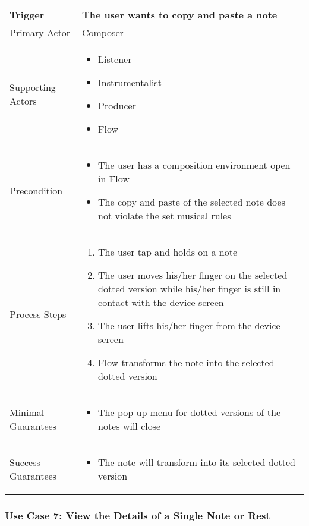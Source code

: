 \begin{tabularx}{\textwidth}{|X|X|}
\hline
Trigger & 
The user wants to copy and paste a note \\
\hline
Primary Actor & 
Composer \\
\hline
Supporting Actors & 
\begin{itemize}
\item Listener
\item Instrumentalist
\item Producer
\item Flow
\end{itemize} \\
\hline
Precondition & 
\begin{itemize}
\item The user has a composition environment open in Flow
\item The copy and paste of the selected note does not violate the set musical rules
\end{itemize} \\
\hline
Process Steps & 
\begin{enumerate}
\item The user tap and holds on a note
\item The user moves his/her finger on the selected dotted version while his/her finger is still in contact with the device screen
\item The user lifts his/her finger from the device screen
\item Flow transforms the note into the selected dotted version
\end{enumerate} \\
\hline
Minimal Guarantees & 
\begin{itemize}
  \item The pop-up menu for dotted versions of the notes will close
\end{itemize} \\
\hline
Success Guarantees & 
\begin{itemize}
  \item The note will transform into its selected dotted version 
\end{itemize} \\
\hline
\end{tabularx}

\subsubsection{Use Case 7: View the Details of a Single Note or Rest}


